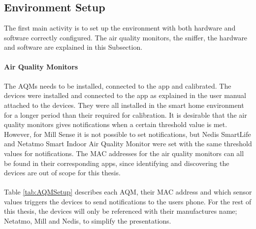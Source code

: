 \subsection{Environment Setup}
The first main activity is to set up the environment with both hardware and software correctly configured. The air quality monitors, the sniffer, the hardware and software are explained in this Subsection. 
\\\\
\textbf{Air Quality Monitors}\\\\
The AQMs needs to be installed, connected to the app and calibrated. The devices were installed and connected to the app as explained in the user manual attached to the devices. They were all installed in the smart home environment for a longer period than their required for calibration. It is desirable that the air quality monitors gives notifications when a certain threshold value is met. However, for Mill Sense it is not possible to set notifications, but Nedis SmartLife and Netatmo Smart Indoor Air Quality Monitor were set with the same threshold values for notifications. The MAC addresses for the air quality monitors can all be found in their corresponding apps, since identifying and discovering the devices are out of scope for this thesis. 
\\\\
Table \ref{tab:AQMSetup} describes each AQM, their MAC address and which sensor values triggers the devices to send notifications to the users phone. For the rest of this thesis, the devices will only be referenced with their manufactures name; Netatmo, Mill and Nedis, to simplify the presentations. 
 
